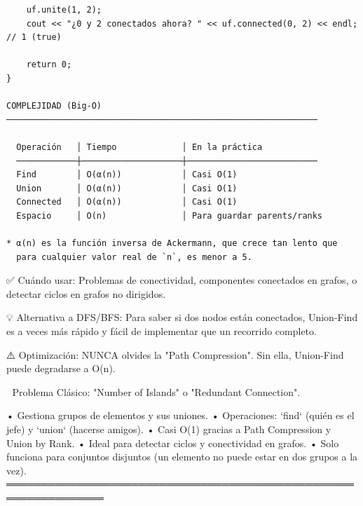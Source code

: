 \begin{lstlisting}
    uf.unite(1, 2);
    cout << "¿0 y 2 conectados ahora? " << uf.connected(0, 2) << endl; // 1 (true)

    return 0;
}

COMPLEJIDAD (Big-O)
──────────────────────────────────────────────────────────────

  Operación   │ Tiempo             │ En la práctica
  ────────────┼────────────────────┼──────────────────────────
  Find        │ O(α(n))            │ Casi O(1)
  Union       │ O(α(n))            │ Casi O(1)
  Connected   │ O(α(n))            │ Casi O(1)
  Espacio     │ O(n)               │ Para guardar parents/ranks

* α(n) es la función inversa de Ackermann, que crece tan lento que 
  para cualquier valor real de `n`, es menor a 5.
\end{lstlisting}

\begin{dsaentrevistas}

✅ Cuándo usar: Problemas de conectividad, componentes conectados 
   en grafos, o detectar ciclos en grafos no dirigidos.

💡 Alternativa a DFS/BFS: Para saber si dos nodos están conectados,
   Union-Find es a veces más rápido y fácil de implementar que 
   un recorrido completo.

⚠️ Optimización: NUNCA olvides la "Path Compression". Sin ella, 
   Union-Find puede degradarse a O(n).

🔑 Problema Clásico: "Number of Islands" o "Redundant Connection".

\end{dsaentrevistas}

\begin{dsaresumen}

• Gestiona grupos de elementos y sus uniones.
• Operaciones: `find` (quién es el jefe) y `union` (hacerse amigos).
• Casi O(1) gracias a Path Compression y Union by Rank.
• Ideal para detectar ciclos y conectividad en grafos.
• Solo funciona para conjuntos disjuntos (un elemento no puede estar
  en dos grupos a la vez).
════════════════════════════════════════════════════════════════

\end{dsaresumen}


